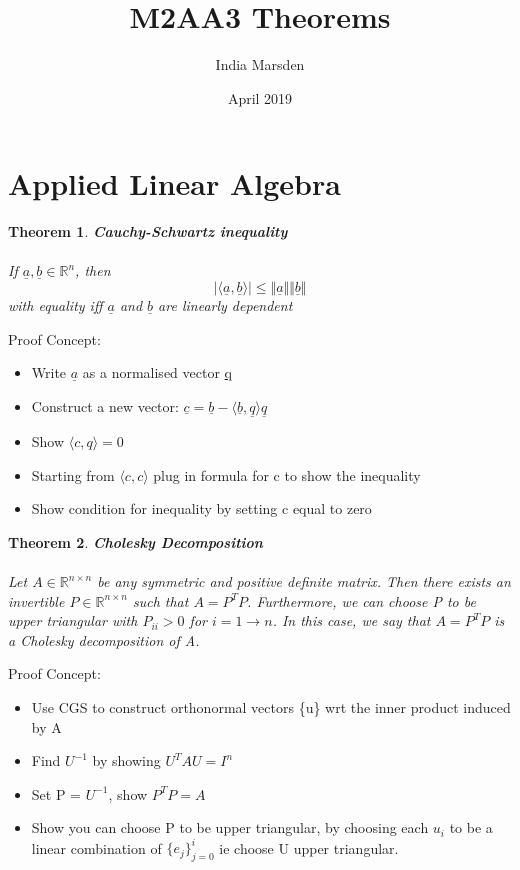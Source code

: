 \documentclass{article}
\title{M2AA3 Theorems}
\author{India Marsden }
\date{April 2019}
\begin{document}
\newtheorem{theorem}{Theorem}
\renewcommand{\labelitemi}{$\textendash$}
\newtheorem{prop}[theorem]{Proposition}

\maketitle

\section{Applied Linear Algebra}

\begin{theorem} \textbf{Cauchy-Schwartz inequality} \\ 
\\
If $\underline{a} , \underline{b} \in \mathbb{R}^n $, then 
$$
\big | \langle \underline{a}, \underline{b} \rangle \big | \leq \Vert \underline{a} \Vert \Vert \underline{b} \Vert
$$ with equality iff $\underline{a}$ and $\underline{b}$ are linearly dependent
\end{theorem}
Proof Concept:
\begin{itemize}
    \item Write $\underline{a}$ as a normalised vector \underline{q} 
    \item Construct a new vector: $\underline{c} = \underline{b} - \langle \underline{b}, \underline{q} \rangle \underline{q} $
    \item Show $\langle c, q \rangle = 0$
    \item Starting from $\langle c, c \rangle$ plug in formula for c to show the inequality
    \item Show condition for inequality by setting c equal to zero
\end{itemize}

\begin{theorem} \textbf{Cholesky Decomposition} 
\\
\\
Let $A \in  \mathbb{R}^{n \times n}$ be any symmetric and positive definite matrix. Then there exists an invertible $P \in \mathbb{R}^{n \times n}$ such that $A = P^T P $. Furthermore, we can choose P to be upper triangular with $P_{ii} > 0$ for $i=1 \to n$. In this case, we say that $A = P^T P$ is a Cholesky decomposition of A.
\end{theorem}
Proof Concept:
\begin{itemize}
    \item Use CGS to construct orthonormal vectors \{u\} wrt the inner product induced by A
    \item Find $U^{-1}$ by showing $U^T A U = I^n$
    \item Set P = $U^{-1}$, show $P^T P = A$
    \item Show you can choose P to be upper triangular, by choosing each $u_i$ to be a linear combination of $\{e_j\}_{j=0}^i$ ie choose U upper triangular.
\end{itemize}
\end{document}
